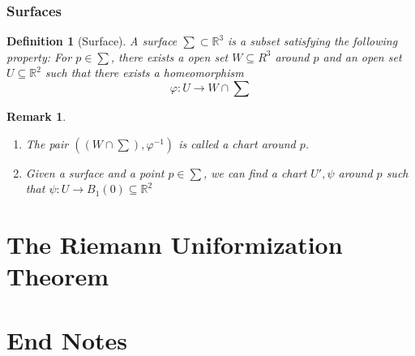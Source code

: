 \documentclass[oneside]{book}\twocolumn
\newtheorem{definition}[theorem]{Definition}
\newtheorem*{remark}{Remark}
\begin{document}
\section{Surfaces}
\begin{definition}[Surface]
A surface $\sum\subset \mathbb R^3$ is a subset satisfying the following property: For $p\in\sum$, there exists a open set $W\subseteq R^3$ around $p$ and an open set $U\subseteq \mathbb R^2 $ such that there exists a homeomorphism
$$\varphi:U\to W\cap \sum $$ 	
\end{definition}
\begin{remark}

	
	\begin{enumerate}
		\item The pair $\left((W\cap\sum),\varphi^{-1}\right)$ is called a chart around $p$.
		\item Given a surface and a point $p\in\sum$, we can find a chart $U',\psi$ around $p$ such that $\psi:U\to B_1(0)\subseteq \mathbb R^2$
	\end{enumerate}
\end{remark}




























\part{The Riemann Uniformization Theorem}

























\part{End Notes}
\end{document}
